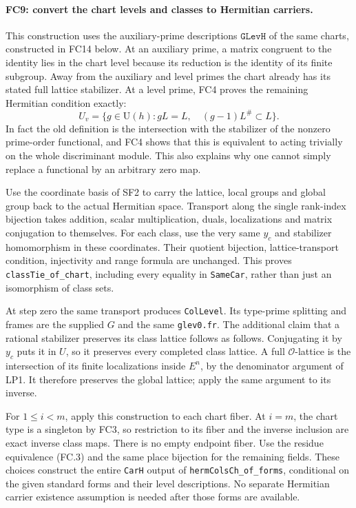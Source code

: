 \paragraph{FC9: convert the chart levels and classes to Hermitian
carriers.}
This construction uses the auxiliary-prime descriptions
$\texttt{GLevH}$ of the same charts, constructed in FC14 below. At an auxiliary prime, a matrix
congruent to the identity lies in the chart level because its reduction
is the identity of its finite subgroup. Away from the auxiliary and
level primes the chart already has its stated full lattice stabilizer.
At a level prime, FC4 proves the remaining Hermitian condition exactly:
\[
 U_v=\{g\in\mathrm U(h):gL=L,\quad
                    (g-1)L^\#\subset L\}.            \tag{FC.20}
\]
In fact the old definition is the intersection with the stabilizer of
the nonzero prime-order functional, and FC4 shows that this is equivalent
to acting trivially on the whole discriminant module. This also explains
why one cannot simply replace a functional by an arbitrary zero map.

Use the coordinate basis of SF2 to carry the lattice, local groups and
global group back to the actual Hermitian space. Transport along the
single rank-index bijection takes addition, scalar multiplication,
duals, localizations and matrix conjugation to themselves. For each
class, use the very same $y_c$ and stabilizer homomorphism in these
coordinates. Their quotient bijection, lattice-transport condition,
injectivity and range formula are unchanged. This proves
\texttt{classTie\_of\_chart}, including every equality in
\texttt{SameCar}, rather than just an isomorphism of class sets.

At step zero the same transport produces \texttt{ColLevel}. Its
type-prime splitting and frames are the supplied $G$ and the same
\texttt{glev0.fr}. The additional claim that a rational stabilizer
preserves its class lattice follows as follows. Conjugating it by $y_c$
puts it in $U$, so it preserves every completed class lattice.
A full $\mathcal O$-lattice is the intersection of its finite localizations
inside $E^n$, by the denominator argument of LP1. It therefore preserves
the global lattice; apply the same argument to its inverse.

For $1\le i<m$, apply this construction to each chart fiber. At
$i=m$, the chart type is a singleton by FC3, so restriction to its
fiber and the inverse inclusion are exact inverse class maps. There
is no empty endpoint fiber. Use the residue equivalence (FC.3) and the
same place bijection for the remaining fields. These choices construct
the entire \texttt{CarH} output of \texttt{hermColsCh\_of\_forms},
conditional on the given standard forms and their level descriptions.
No separate Hermitian carrier existence assumption is needed after
those forms are available.

